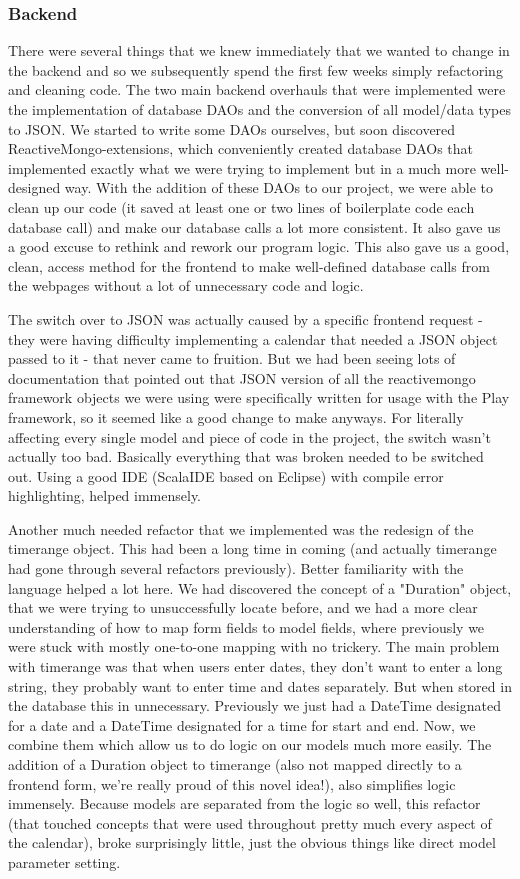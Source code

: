 \documentclass{article}
\begin{document}
\subsubsection{Backend}
There were several things that we knew immediately that we wanted to change in the backend and so we subsequently spend the first few weeks simply refactoring and cleaning code. The two main backend overhauls that were implemented were the implementation of database DAOs and the conversion of all model/data types to JSON. We started to write some DAOs ourselves, but soon discovered ReactiveMongo-extensions, which conveniently created database DAOs that implemented exactly what we were trying to implement but in a much more well-designed way. With the addition of these DAOs to our project, we were able to clean up our code (it saved at least one or two lines of boilerplate code each database call) and make our database calls a lot more consistent. It also gave us a good excuse to rethink and rework our program logic. This also gave us a good, clean, access method for the frontend to make well-defined database calls from the webpages without a lot of unnecessary code and logic.

The switch over to JSON was actually caused by a specific frontend request - they were having difficulty implementing a calendar that needed a JSON object passed to it - that never came to fruition. But we had been seeing lots of documentation that pointed out that JSON version of all the reactivemongo framework objects we were using were specifically written for usage with the Play framework, so it seemed like a good change to make anyways. For literally affecting every single model and piece of code in the project, the switch wasn't actually too bad. Basically everything that was broken needed to be switched out. Using a good IDE (ScalaIDE based on Eclipse) with compile error highlighting, helped immensely.

Another much needed refactor that we implemented was the redesign of the timerange object. This had been a long time in coming (and actually timerange had gone through several refactors previously). Better familiarity with the language helped a lot here. We had discovered the concept of a "Duration" object, that we were trying to unsuccessfully locate before, and we had a more clear understanding of how to map form fields to model fields, where previously we were stuck with mostly one-to-one mapping with no trickery. The main problem with timerange was that when users enter dates, they don't want to enter a long string, they probably want to enter time and dates separately. But when stored in the database this in unnecessary. Previously we just had a DateTime designated for a date and a DateTime designated for a time for start and end. Now, we combine them which allow us to do logic on our models much more easily. The addition of a Duration object to timerange (also not mapped directly to a frontend form, we're really proud of this novel idea!), also simplifies logic immensely. Because models are separated from the logic so well, this refactor (that touched concepts that were used throughout pretty much every aspect of the calendar), broke surprisingly little, just the obvious things like direct model parameter setting.
\end{document}
